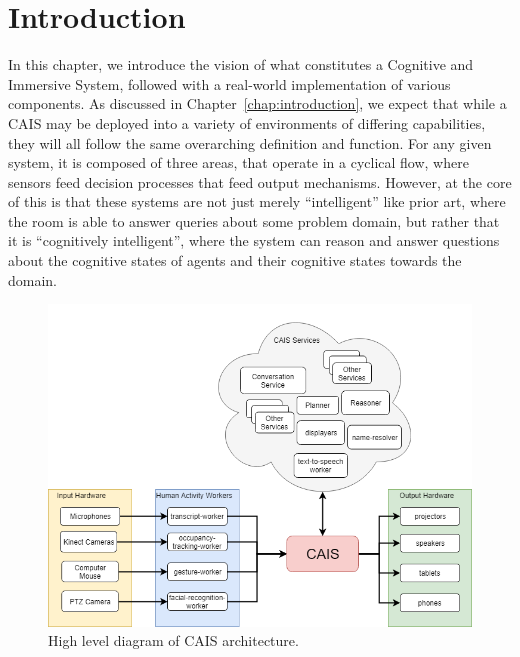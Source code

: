 \section{Introduction}

In this chapter, we introduce the vision of what constitutes a Cognitive and
Immersive System, followed with a real-world implementation of various
components. As discussed in Chapter~\ref{chap:introduction}, we expect that
while a CAIS may be deployed into a variety of environments of differing
capabilities, they will all follow the same overarching definition and function.
For any given system, it is composed of three areas, that operate in a
cyclical flow, where sensors feed decision processes that feed output mechanisms.
However, at the core of this is that these systems are not just merely ``intelligent''
like prior art, where the room is able to answer queries about some problem domain,
but rather that it is ``cognitively intelligent'', where the system can reason
and answer questions about the cognitive states of agents and their cognitive
states towards the domain.

\begin{figure}
    \centering
    \includegraphics[width=0.5\columnwidth]{chapters/02_technology/figures/cais_high_level.png}
    \caption{High level diagram of CAIS architecture.}
    \label{fig:cycle-cais}
\end{figure}
